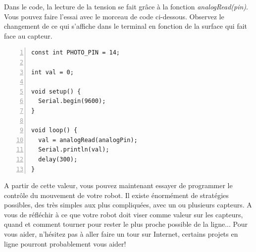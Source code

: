 Dans le code, la lecture de la tension se fait grâce à la fonction \textit{analogRead(pin)}. Vous pouvez faire l'essai avec le morceau de code ci-dessous. Observez le changement de ce qui s'affiche dans le terminal en fonction de la surface qui fait face au capteur. 

\lstset{language=C}
\begin{lstlisting}[frame=single,numbers=left,numberstyle=\small,label={code1},caption={Lecture de la photodiode.}]
const int PHOTO_PIN = 14;

int val = 0; 

void setup() {
  Serial.begin(9600); 
}

void loop() {
  val = analogRead(analogPin);  
  Serial.println(val);      
  delay(300);
}

\end{lstlisting}

A partir de cette valeur, vous pouvez maintenant essayer de programmer le contrôle du mouvement de votre robot. Il existe énormément de stratégies possibles, des très simples aux plus compliquées, avec un ou plusieurs capteurs. A vous de réfléchir à ce que votre robot doit viser comme valeur sur les capteurs, quand et comment tourner pour rester le plus proche possible de la ligne... Pour vous aider, n'hésitez pas à aller faire un tour sur Internet, certains projets en ligne pourront probablement vous aider!